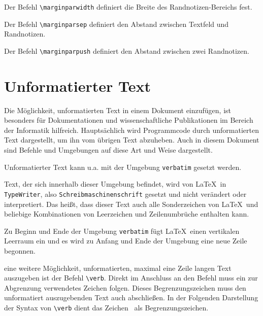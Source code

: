 \documentclass[a4paper,10pt,twoside]{scrbook}
\begin{document}
Der Befehl \verb!\marginparwidth! definiert die Breite des Randnotizen-Bereichs fest.


Der Befehl \verb!\marginparsep! definiert den Abstand zwischen Textfeld und Randnotizen.




Der Befehl \verb!\marginparpush! definiert den Abstand zwischen zwei Randnotizen.




\section{Unformatierter Text}

Die Möglichkeit, unformatierten Text in einem Dokument einzufügen, ist 
besonders für Dokumentationen und wissenschaftliche 
Publikationen im Bereich der Informatik hilfreich. 
Hauptsächlich wird Programmcode durch unformatierten Text dargestellt, um ihn 
vom übrigen Text abzuheben.
Auch in diesem Dokument sind Befehle und Umgebungen auf diese Art und Weise dargestellt.


Unformatierter Text kann u.a. mit der Umgebung \verb!verbatim! 
gesetzt werden. 



Text, der sich innerhalb dieser Umgebung befindet, wird von \LaTeX\ in \verb!TypeWriter!, also \verb!Schreibmaschinenschrift! gesetzt und nicht verändert oder interpretiert.
Das heißt, dass dieser Text auch alle Sonderzeichen von \LaTeX\ 
und beliebige Kombinationen von Leerzeichen und Zeilenumbrüche enthalten kann. 

Zu Beginn und Ende der Umgebung \verb!verbatim! fügt \LaTeX\ einen
vertikalen Leerraum ein und es wird zu
Anfang und Ende der Umgebung eine neue Zeile begonnen.

eine weitere Möglichkeit, unformatierten,
maximal eine Zeile langen Text auszugeben ist der Befehl \verb!\verb!.
Direkt im Anschluss an den Befehl muss ein zur Abgrenzung verwendetes Zeichen folgen.
Dieses Begrenzungszeichen muss den unformatiert auszugebenden Text auch abschließen. 
In der Folgenden Darstellung der Syntax von \verb!\verb! dient das Zeichen \texttimes\ als Begrenzungszeichen.
\end{document}
